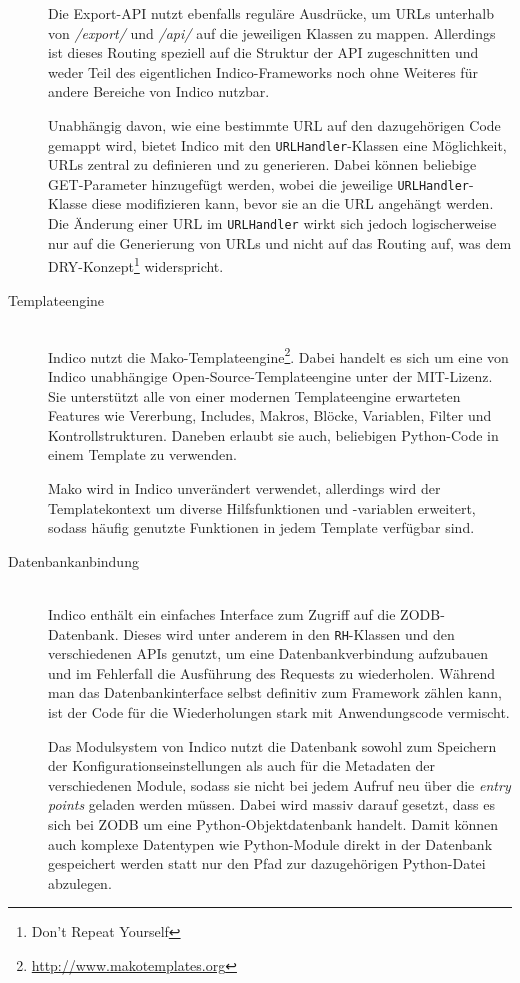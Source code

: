 \begin{description}
Die Export-API nutzt ebenfalls reguläre Ausdrücke, um URLs unterhalb von \emph{/export/} und
\emph{/api/} auf die jeweiligen Klassen zu mappen. Allerdings ist dieses Routing speziell auf die
Struktur der API zugeschnitten und weder Teil des eigentlichen Indico-Frameworks noch ohne Weiteres
für andere Bereiche von Indico nutzbar.

Unabhängig davon, wie eine bestimmte URL auf den dazugehörigen Code gemappt wird, bietet Indico mit
den \lstinline{URLHandler}-Klassen eine Möglichkeit, URLs zentral zu definieren und zu generieren.
Dabei können beliebige GET-Parameter hinzugefügt werden, wobei die jeweilige
\lstinline{URLHandler}-Klasse diese modifizieren kann, bevor sie an die URL angehängt werden. Die
Änderung einer URL im \lstinline{URLHandler} wirkt sich jedoch logischerweise nur auf die
Generierung von URLs und nicht auf das Routing auf, was dem DRY-Konzept\footnote{Don't Repeat
Yourself} widerspricht.


\item[Templateengine] \hfill \\
Indico nutzt die Mako-Templateengine\footnote{\href{http://www.makotemplates.org}{http://www.makotemplates.org}}.
Dabei handelt es sich um eine von Indico unabhängige Open-Source-Templateengine unter der
MIT-Lizenz. Sie unterstützt alle von einer modernen Templateengine erwarteten Features wie
Vererbung, Includes, Makros, Blöcke, Variablen, Filter und Kontrollstrukturen. Daneben erlaubt sie
auch, beliebigen Python-Code in einem Template zu verwenden.

Mako wird in Indico unverändert verwendet, allerdings wird der Templatekontext um diverse
Hilfsfunktionen und -variablen erweitert, sodass häufig genutzte Funktionen in jedem Template
verfügbar sind.




\item[Datenbankanbindung] \hfill \\
Indico enthält ein einfaches Interface zum Zugriff auf die ZODB-Datenbank. Dieses wird unter anderem
in den \lstinline{RH}-Klassen und den verschiedenen APIs genutzt, um eine Datenbankverbindung
aufzubauen und im Fehlerfall die Ausführung des Requests zu wiederholen. Während man das
Datenbankinterface selbst definitiv zum Framework zählen kann, ist der Code für die Wiederholungen
stark mit Anwendungscode vermischt.

Das Modulsystem von Indico nutzt die Datenbank sowohl zum Speichern der Konfigurationseinstellungen
als auch für die Metadaten der verschiedenen Module, sodass sie nicht bei jedem Aufruf neu über die
\emph{entry points} geladen werden müssen. Dabei wird massiv darauf gesetzt, dass es sich bei ZODB
um eine Python-Objektdatenbank handelt. Damit können auch komplexe Datentypen wie Python-Module
direkt in der Datenbank gespeichert werden statt nur den Pfad zur dazugehörigen Python-Datei
abzulegen.



\end{description}
